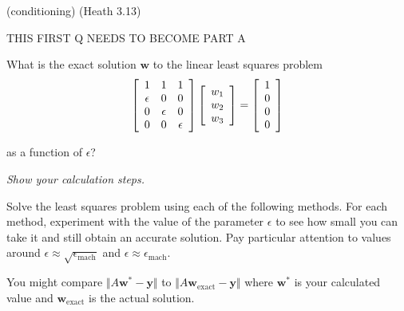 \documentclass[12pt,letterpaper,noanswers]{exam}
\newcommand{\vc}[1]{\boldsymbol{#1}}
\begin{document}
\begin{questions}

\question (conditioning) (Heath 3.13)

THIS FIRST Q NEEDS TO BECOME PART A 

What is the exact solution $\vc{w}$ to the linear least squares problem 
\[\left[\begin{array}{c c c} 
1 & 1& 1\\
\epsilon & 0 & 0 \\
 0 & \epsilon &0 \\
 0 & 0 & \epsilon \\
\end{array}\right]
\left[\begin{array}{c} 
w_1 \\ w_2 \\ w_3
\end{array}\right] = \left[\begin{array}{c} 
1 \\ 0 \\ 0 \\ 0
\end{array}\right]\]

as a function of $\epsilon$?

\emph{Show your calculation steps.}


Solve the least squares problem using each of the following methods.  For each method, experiment with the value of the parameter $\epsilon$ to see how small you can take it and still obtain an accurate solution.  Pay particular attention to values around $\epsilon \approx \sqrt{\epsilon_{\text{mach}}}$ and $\epsilon \approx \epsilon_{\text{mach}}$.

You might compare $\Vert A\vc{w}^* - \vc{y}\Vert$ to $\Vert A\vc{w}_{\text{exact}} - \vc{y}\Vert$ where $\vc{w}^*$ is your calculated value and $\vc{w}_{\text{exact}}$ is the actual solution.


\end{questions}
\end{document}
